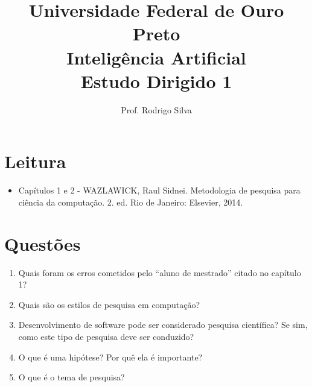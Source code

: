 \documentclass{article}
\title{\vspace{-2 cm}Universidade Federal de Ouro Preto \\ Inteligência Artificial \\ Estudo Dirigido 1}
\author{Prof. Rodrigo Silva}
\date{}
\begin{document}
\maketitle

\section{Leitura}

\begin{itemize}
    \item Capítulos 1 e 2 - WAZLAWICK, Raul Sidnei. Metodologia de pesquisa para ciência da computação. 2. ed. Rio de Janeiro: Elsevier, 2014.
\end{itemize}

\section{Questões}

\begin{enumerate}

\item Quais foram os erros cometidos pelo ``aluno de mestrado'' citado no capítulo 1?

\item Quais são os estilos de pesquisa em computação?

\item Desenvolvimento de software pode ser considerado pesquisa científica? Se sim, como este tipo de pesquisa deve ser conduzido?

\item O que é uma hipótese? Por quê ela é importante?

\item O que é o tema de pesquisa?

\end{enumerate}


%
%
\end{document}
